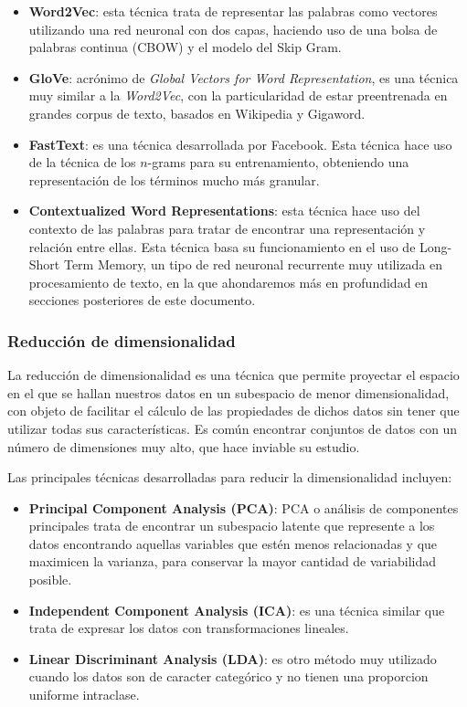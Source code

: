 \begin{itemize}
    \item \textbf{Word2Vec}: esta técnica trata de representar las palabras como vectores utilizando una red neuronal con dos capas, haciendo uso de una bolsa de palabras continua (CBOW) y el modelo del Skip Gram. \cite{Mikolov2013Word2Vec}
    \item \textbf{GloVe}: acrónimo de \textit{Global Vectors for Word Representation}, es una técnica muy similar a la \textit{Word2Vec}, con la particularidad de estar preentrenada en grandes corpus de texto, basados en Wikipedia y Gigaword. \cite{Pennington2014GloveGV}
    \item \textbf{FastText}: es una técnica desarrollada por Facebook. Esta técnica hace uso de la técnica de los $n$-grams para su entrenamiento, obteniendo una representación de los términos mucho más granular. \cite{Bojanowski2017EnrichingWV}
    \item \textbf{Contextualized Word Representations}: esta técnica hace uso del contexto de las palabras para tratar de encontrar una representación y relación entre ellas. Esta técnica basa su funcionamiento en el uso de Long-Short Term Memory, un tipo de red neuronal recurrente muy utilizada en procesamiento de texto, en la que ahondaremos más en profundidad en secciones posteriores de este documento. \cite{Melamud2016context2vecLG}
\end{itemize}

\subsubsection{Reducción de dimensionalidad}
La reducción de dimensionalidad es una técnica que permite proyectar el espacio en el que se hallan nuestros datos en un subespacio de menor dimensionalidad, con objeto de facilitar el cálculo de las propiedades de dichos datos sin tener que utilizar todas sus características. Es común encontrar conjuntos de datos con un número de dimensiones muy alto, que hace inviable su estudio.

Las principales técnicas desarrolladas para reducir la dimensionalidad incluyen:

\begin{itemize}
    \item \textbf{Principal Component Analysis (PCA)}: PCA o análisis de componentes principales trata de encontrar un subespacio latente que represente a los datos encontrando aquellas variables que estén menos relacionadas y que maximicen la varianza, para conservar la mayor cantidad de variabilidad posible. \cite{Jolliffe:1986} 
    \item \textbf{Independent Component Analysis (ICA)}: es una técnica similar que trata de expresar los datos con transformaciones lineales. \cite{Hyvrinen2014TopographicIC}
    \item \textbf{Linear Discriminant Analysis (LDA)}: es otro método muy utilizado cuando los datos son de caracter categórico y no tienen una proporcion uniforme intraclase. \cite{LDA2009}
\end{itemize}


